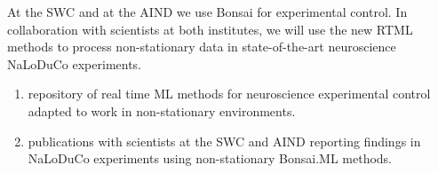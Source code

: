 At the SWC and at the AIND we use Bonsai for experimental control. In
collaboration with scientists at both institutes, we will use the new RTML
methods to process non-stationary data in state-of-the-art
neuroscience NaLoDuCo experiments.


\begin{enumerate}

    \item repository of real time ML methods for neuroscience experimental
        control adapted to work in non-stationary environments.

    \item publications with scientists at the SWC and AIND reporting findings
        in NaLoDuCo experiments using non-stationary Bonsai.ML methods.

\end{enumerate}
